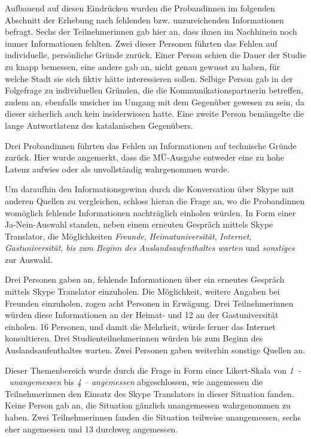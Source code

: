 Aufbauend auf diesen Eindrücken wurden die Proband{\textperiodcentered}innen im folgenden Abschnitt der Erhebung nach fehlenden bzw. unzureichenden Informationen befragt. Sechs der Teilnehmer{\textperiodcentered}innen gab hier an, dass ihnen im Nachhinein noch immer Informationen fehlten. Zwei dieser Personen führten das Fehlen auf individuelle, persönliche Gründe zurück. Einer Person schien die Dauer der Studie zu knapp bemessen, eine andere gab an, nicht genau gewusst zu haben, für welche Stadt sie sich fiktiv hätte interessieren sollen. Selbige Person gab in der Folgefrage zu individuellen Gründen, die die Kommunikationspartner{\textperiodcentered}in betreffen, zudem an, ebenfalls unsicher im Umgang mit dem Gegenüber gewesen zu sein, da dieser \glqq sicherlich auch kein insiderwissen\grqq{} hatte. Eine zweite Person bemängelte die lange Antwortlatenz des katalanischen Gegenübers.

Drei Proband{\textperiodcentered}innen führten das Fehlen an Informationen auf technische Gründe zurück. Hier wurde angemerkt, dass die MÜ-Ausgabe entweder eine zu hohe Latenz aufwies oder als unvollständig wahrgenommen wurde.

Um daraufhin den Informationsgewinn durch die Konversation über Skype mit anderen Quellen zu vergleichen, schloss hieran die Frage an, wo die Proband{\textperiodcentered}innen womöglich fehlende Informationen nachträglich einholen würden. In Form einer Ja-Nein-Auswahl standen, neben einem erneuten Gespräch mittels Skype Translator, die Möglichkeiten \emph{Freunde}, \emph{Heimatuniversität}, \emph{Internet}, \emph{Gastuniversität}, \emph{bis zum Beginn des Auslandsaufenthaltes warten} und \emph{sonstiges} zur Auswahl.

\begin{sloppypar}
Drei Personen gaben an, fehlende Informationen über ein erneutes Gespräch mittels Skype Translator einzuholen. Die Möglichkeit, weitere Angaben bei Freunden einzuholen, zogen acht Personen in Erwägung. Drei Teilnehmer{\textperiodcentered}innen würden diese Informationen an der Heimat- und 12 an der Gastuniversität einholen. 16 Personen, und damit die Mehrheit, würde ferner das Internet konsultieren. Drei Studienteilnehmer{\textperiodcentered}innen würden bis zum Beginn des Auslandsaufenthaltes warten. Zwei Personen gaben weiterhin sonstige Quellen an.
\end{sloppypar}
	
Dieser Themenbereich wurde durch die Frage in Form einer Likert-Skala von \emph{1~-~unangemessen} bis \emph{4 – angemessen} abgeschlossen, wie angemessen die Teilnehmer{\textperiodcentered}innen den Einsatz des Skype Translators in dieser Situation fanden. Keine Person gab an, die Situation gänzlich unangemessen wahrgenommen zu haben. Zwei Teilnehmer{\textperiodcentered}innen fanden die Situation teilweise unangemessen, sechs eher angemessen und 13 durchweg angemessen.

